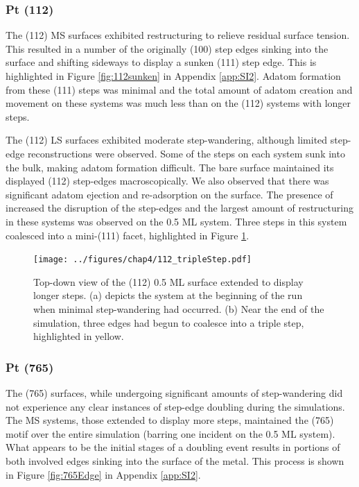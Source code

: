 \subsubsection{Pt (112)}
The (112) MS surfaces exhibited restructuring to relieve residual surface tension.
This resulted in a number of the
originally (100) step edges sinking into the surface and shifting
sideways to display a sunken (111) step edge. This is highlighted in Figure
\ref{fig:112sunken} in Appendix \ref{app:SI2}.  Adatom formation from these (111)
steps was minimal and the total amount of adatom creation and movement on
these systems was much less than on the (112) systems with longer steps. 

The (112) LS surfaces exhibited moderate step-wandering, although limited
step-edge reconstructions were observed. Some of the steps on each system sunk
into the bulk, making adatom formation difficult.  The bare surface maintained
its displayed (112) step-edges macroscopically.  We also observed that there
was significant adatom ejection and re-adsorption on the surface. The presence
of  increased the disruption of the step-edges and the largest amount of
restructuring in these systems was observed on the 0.5 ML system.  Three steps
in this system coalesced into a mini-(111) facet, highlighted in Figure
\ref{fig:tripleStep}.

\begin{figure}
\centering
  \texttt{[image: ../figures/chap4/112\_tripleStep.pdf]}
  \caption{Top-down view of the (112) 0.5 ML surface extended to display longer
steps. (a) depicts the system at the beginning of the run when minimal
step-wandering had occurred. (b) Near the end of the simulation, three edges
had begun to coalesce into a triple step, highlighted in yellow.}
  \label{fig:tripleStep}
\end{figure}

\subsubsection{Pt (765)}
The (765) surfaces, while undergoing significant amounts of step-wandering did
not experience any clear instances of step-edge doubling during the
simulations. The MS systems, those extended to display more steps, maintained
the (765) motif over the entire simulation (barring one incident on the 0.5 ML
system). What appears to be the initial stages of a doubling event results in
portions of both involved edges sinking into the surface of the metal. This
process is shown in Figure \ref{fig:765Edge} in Appendix \ref{app:SI2}.

